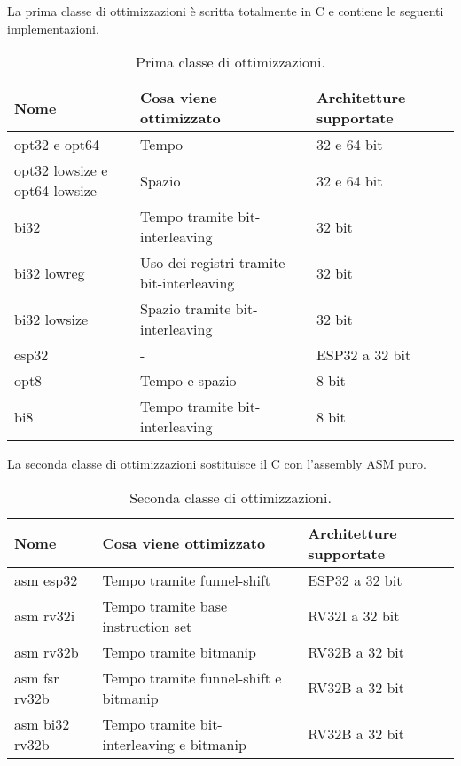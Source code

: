\noindent La prima classe di ottimizzazioni è scritta totalmente in C e contiene le seguenti implementazioni\cite{github}.

\begin{table}[H]
    \centering
	\begin{tabular}{|m{}<{\centering}||m{}<{\centering}|m{}<{\centering}|}
		\hline
        \textbf{Nome} & \textbf{Cosa viene ottimizzato} & \textbf{Architetture supportate} \\
		\hline \hline
        opt32 e opt64 & Tempo & 32 e 64 bit \\
        \hline
        opt32 lowsize e opt64 lowsize & Spazio & 32 e 64 bit \\
        \hline
        bi32 & Tempo tramite bit-interleaving & 32 bit \\
        \hline
        bi32 lowreg & Uso dei registri tramite bit-interleaving & 32 bit \\
        \hline
        bi32 lowsize & Spazio tramite bit-interleaving & 32 bit \\
        \hline
        esp32 & - & ESP32 a 32 bit \\
        \hline
        opt8 & Tempo e spazio & 8 bit \\
        \hline
        bi8 & Tempo tramite bit-interleaving & 8 bit \\
        \hline
    \end{tabular}
    \caption{Prima classe di ottimizzazioni.}
\end{table}

\noindent La seconda classe di ottimizzazioni sostituisce il C con l'assembly ASM puro\cite{github}.

\begin{table}[H]
    \centering
	\begin{tabular}{|m{}<{\centering}||m{}<{\centering}|m{}<{\centering}|}
		\hline
		\textbf{Nome} & \textbf{Cosa viene ottimizzato} & \textbf{Architetture supportate} \\
        \hline \hline
        asm esp32 & Tempo tramite funnel-shift & ESP32 a 32 bit \\
        \hline
        asm rv32i & Tempo tramite base instruction set & RV32I a 32 bit \\
        \hline
        asm rv32b & Tempo tramite bitmanip & RV32B a 32 bit \\
        \hline
        asm fsr rv32b & Tempo tramite funnel-shift e bitmanip & RV32B a 32 bit \\
        \hline
        asm bi32 rv32b & Tempo tramite bit-interleaving e bitmanip & RV32B a 32 bit \\
        \hline
    \end{tabular}
    \caption{Seconda classe di ottimizzazioni.}
\end{table}

